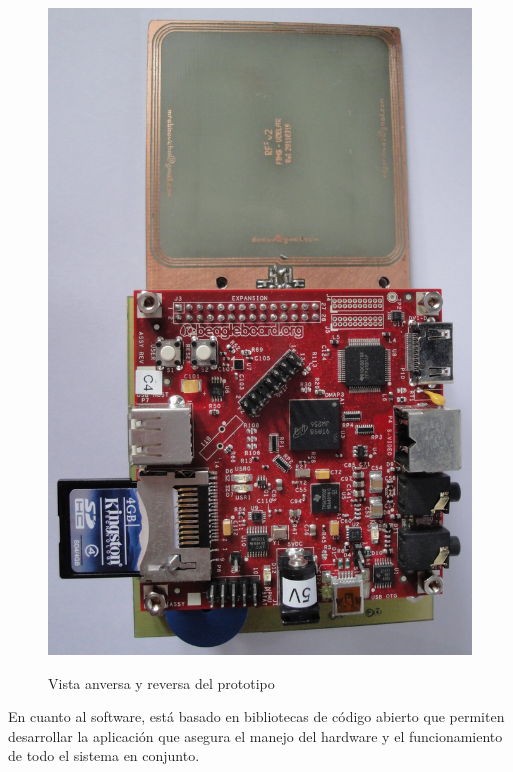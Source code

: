 \begin{figure}[H]
{  \includegraphics[scale=.13]{Imagenes/prototipo_b.jpg} }

  \caption{Vista anversa y reversa del prototipo}\label{protoFB}
\end{figure}

En cuanto al software, está basado en bibliotecas de código abierto que permiten desarrollar la aplicación que asegura el manejo del hardware y el funcionamiento de todo el sistema en conjunto.


